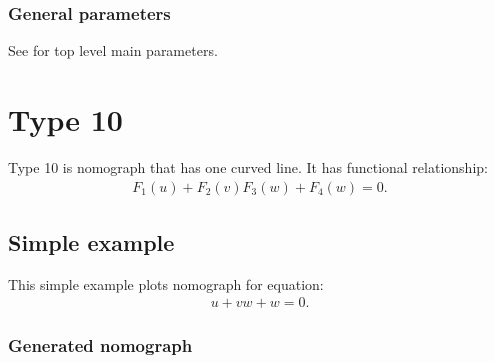 \documentclass[a4paper,11pt,english]{sphinxmanual}
\begin{document}
\subsubsection{General parameters}
\label{\detokenize{types/types:id46}}
See {\hyperref[\detokenize{main_params:main-params}]{}} for top level main parameters.


\section{Type 10}
\label{\detokenize{types/types:type-10}}\label{\detokenize{types/types:type10-ref}}
Type 10 is nomograph that has one curved line. It has functional relationship:
\begin{equation*}
\begin{split}F_1(u)+F_2(v)F_3(w)+F_4(w)=0.\end{split}
\end{equation*}

\subsection{Simple example}
\label{\detokenize{types/types:id47}}
This simple example plots nomograph for equation:
\begin{equation*}
\begin{split}u + v w + w = 0.\end{split}
\end{equation*}

\subsubsection{Generated nomograph}
\label{\detokenize{types/types:id48}}
\noindent{}
\end{document}
